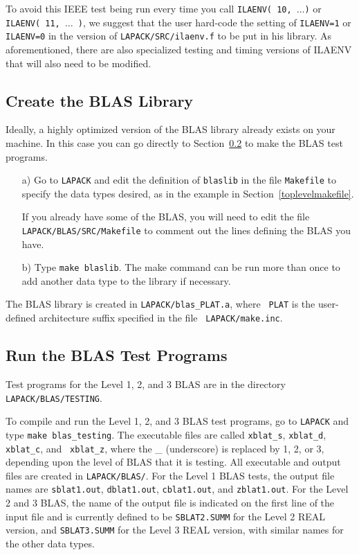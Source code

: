 To avoid this IEEE test being run every time you call
{\tt ILAENV( 10, $\ldots$)} or {\tt ILAENV( 11, $\ldots$ )}, we suggest
that the user hard-code the setting of
{\tt ILAENV=1} or {\tt ILAENV=0} in the version of {\tt LAPACK/SRC/ilaenv.f} to be put in
his library.  As aforementioned, there are also specialized testing and
timing versions of ILAENV that will also need to be modified.

\subsection{Create the BLAS Library} 
\dent
Ideally, a highly optimized version of the BLAS library already
exists on your machine. 
In this case you can go directly to Section~\ref{testblas} to
make the BLAS test programs.  

\begin{itemize}
\item[a)]
Go to {\tt LAPACK} and edit the definition of {\tt blaslib} in the
file {\tt Makefile} to specify the data types desired, as in the example
in Section~\ref{toplevelmakefile}.

If you already have some of the BLAS, you will need to edit the file
{\tt LAPACK/BLAS/SRC/Makefile} to comment out the lines 
defining the BLAS you have.  

\item[b)]
Type {\tt make blaslib}.
The make command can be run more than once to add another
data type to the library if necessary.  
\end{itemize}

\noindent
The BLAS library is created in {\tt LAPACK/blas\_PLAT.a}, where {\tt
PLAT} is the user-defined architecture suffix specified in the file {\tt
LAPACK/make.inc}.

\subsection{Run the BLAS Test Programs}\label{testblas}

\dent
Test programs for the Level 1, 2, and 3 BLAS are in the directory 
{\tt LAPACK/BLAS/TESTING}.

To compile and run the Level 1, 2, and 3 BLAS test programs,
go to {\tt LAPACK} and type {\tt make blas\_testing}.  The executable
files are called {\tt xblat\_s}, {\tt xblat\_d}, {\tt xblat\_c}, and {\tt
xblat\_z}, where the \_ (underscore) is replaced by 1, 2, or 3,
depending upon the level of BLAS that it is testing.  All executable and
output files are created in {\tt LAPACK/BLAS/}.
For the Level 1 BLAS tests, the output file names are {\tt sblat1.out},
{\tt dblat1.out}, {\tt cblat1.out}, and {\tt zblat1.out}.  For the Level
2 and 3 BLAS, the name of the output file is indicated on the first line of the
input file and is currently defined to be {\tt SBLAT2.SUMM} for
the Level 2 REAL version, and {\tt SBLAT3.SUMM} for the Level 3 REAL
version, with similar names for the other data types.

